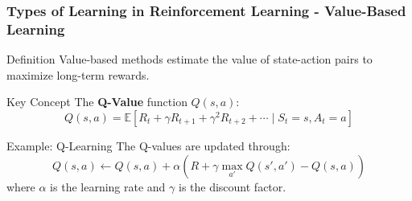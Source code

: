 \documentclass[aspectratio=169]{beamer}
\begin{document}
\begin{frame}[fragile]
    \frametitle{Types of Learning in Reinforcement Learning - Value-Based Learning}
    \begin{block}{Definition}
        Value-based methods estimate the value of state-action pairs to maximize long-term rewards.
    \end{block}
    
    \begin{block}{Key Concept}
        The \textbf{Q-Value} function \( Q(s, a) \):
        \begin{equation}
        Q(s, a) = \mathbb{E} \left[ R_t + \gamma R_{t+1} + \gamma^2 R_{t+2} + \cdots \mid S_t = s, A_t = a \right]
        \end{equation}
    \end{block}
    
    \begin{block}{Example: Q-Learning}
        The Q-values are updated through:
        \begin{equation}
        Q(s, a) \leftarrow Q(s, a) + \alpha \left( R + \gamma \max_{a'} Q(s', a') - Q(s, a) \right)
        \end{equation}
        where \( \alpha \) is the learning rate and \( \gamma \) is the discount factor.
    \end{block}
\end{frame}
\end{document}
